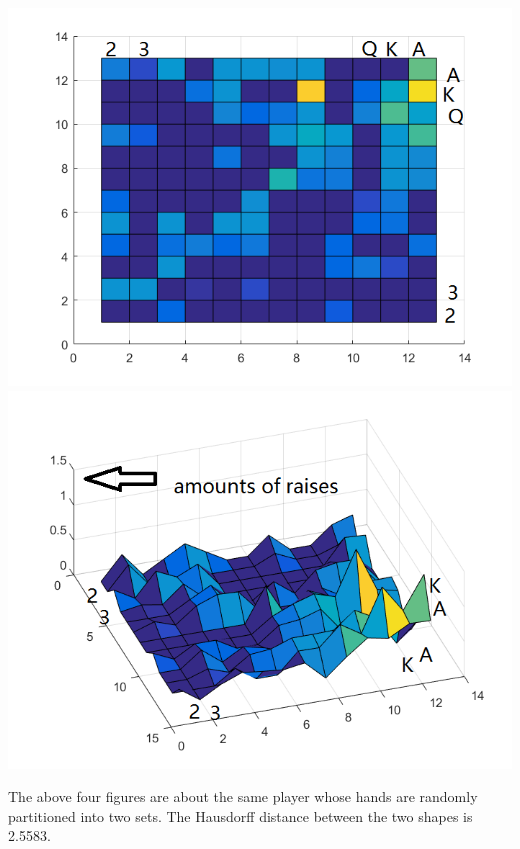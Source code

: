\documentclass[12pt]{article}
\begin{document}
\includegraphics[scale=.5]{B0mR}
\includegraphics[scale=.5]{B0mR1}

The above four figures are about the same player whose hands are randomly partitioned into two sets. The Hausdorff distance between the two shapes is 2.5583.
\end{document}
